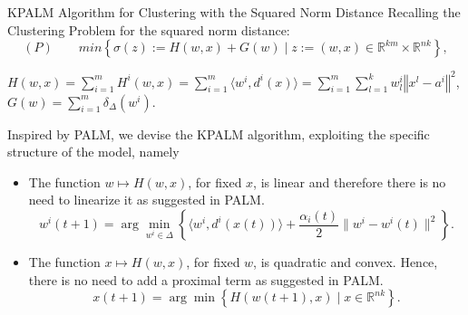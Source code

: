 \documentclass[9pt,handout]{beamer} %
\newcommand{\R}{\mathbb{R}} %
\newcommand{\norm}[1]{\left\Vert {#1} \right\Vert} %
\begin{document}
	\begin{frame}{KPALM Algorithm for Clustering with the Squared Norm Distance}
	Recalling the Clustering Problem for the squared norm distance:
		\begin{equation*}
				(P) \qquad min \left\lbrace \sigma(z) := H(w,x) + G(w) \mid z := (w,x) \in \R^{km} \times \R^{nk} \right\rbrace, 
		\end{equation*}
		\begin{center}
		$H(w,x) = \sum\limits_{i=1}^{m} H^i(w,x) = \sum\limits_{i=1}^{m} \langle w^i , d^i(x) \rangle = \sum\limits_{i=1}^m\sum\limits_{l=1}^k w^i_l \norm{x^l - a^i}^2$, $G(w) = \sum\limits_{i=1}^{m} \delta_{\Delta}(w^i)$.\\
		\end{center}
		Inspired by PALM, we devise the KPALM algorithm, exploiting the specific structure of the model, namely
		\pause
		\begin{itemize}[<+->]
	    	\item The function $w \mapsto H(w,x)$, for fixed $x$, is linear and therefore there is no need to linearize it as suggested in PALM.
	    	\begin{equation*}
				w^i(t+1) = \arg\!\min\limits_{w^i \in \Delta} \left\lbrace \langle w^i , d^i(x(t)) \rangle + \frac{\alpha_i(t)}{2} \|w^i - w^i(t)\|^2 \right\rbrace. \label{W_update_step}
			\end{equation*}
	    	\item The function $x \mapsto H(w,x)$, for fixed $w$, is quadratic and convex. Hence, there is no need to add a proximal term as suggested in PALM.
	    	\begin{equation*}
				x(t+1) = \arg\!\min \left\lbrace H(w(t+1), x) \mid x \in \mathbb{R}^{nk} \right\rbrace. \label{X_update_step}
			\end{equation*}
	    \end{itemize}
	\end{frame}
	
\end{document}
